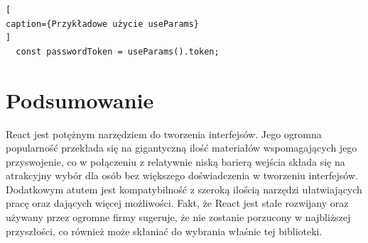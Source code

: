 \documentclass[oneside,polski,logo,indent]{amuthesis}
\begin{document}
\begin{lstlisting}[
caption={Przykładowe użycie useParams}
]
  const passwordToken = useParams().token;

\end{lstlisting}


\section{Podsumowanie}
React jest potężnym narzędziem do tworzenia interfejsów. Jego ogromna popularność przekłada się na gigantyczną ilość materiałów wspomagających jego przyswojenie, co w połączeniu z relatywnie niską barierą wejścia składa się na atrakcyjny wybór dla osób bez większego doświadczenia w tworzeniu interfejsów.
Dodatkowym atutem jest kompatybilność z szeroką ilością narzędzi ułatwiających pracę oraz dających więcej możliwości. Fakt, że React jest stale rozwijany oraz używany przez ogromne firmy
sugeruje, że nie zostanie porzucony w najbliższej przyszłości, co również może skłaniać do wybrania właśnie tej biblioteki.


\nocite{*}


\printbibliography
\end{document}
